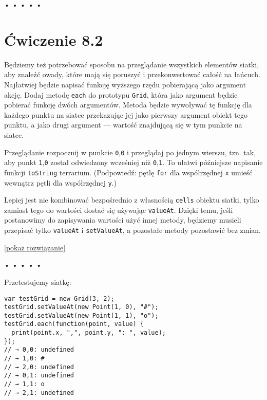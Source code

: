 \begin{center}
• • • • •
\end{center}

  
\section*{Ćwiczenie 8.2}
\label{sec:8.2}
  
    
Będziemy też potrzebować sposobu na przeglądanie wszystkich elementów siatki, aby znaleźć owady, które mają się poruszyć i przekonwertować całość na łańcuch. Najłatwiej będzie napisać funkcję wyższego rzędu pobierającą jako argument akcję. Dodaj metodę \texttt{each} do prototypu \texttt{Grid}, która jako argument będzie pobierać funkcję dwóch argumentów. Metoda będzie wywoływać tę funkcję dla każdego punktu na siatce przekazując jej jako pierwszy argument obiekt tego punktu, a jako drugi argument — wartość znajdującą się w tym punkcie na siatce.

    
Przeglądanie rozpocznij w punkcie \texttt{0},\texttt{0} i przeglądaj po jednym wierszu, tzn. tak, aby punkt \texttt{1},\texttt{0} został odwiedzony wcześniej niż \texttt{0},\texttt{1}. To ułatwi późniejsze napisanie funkcji \texttt{toString} terrarium. (Podpowiedź: pętlę \texttt{for} dla współrzędnej \texttt{x} umieść wewnątrz pętli dla współrzędnej \texttt{y}.)

    
Lepiej jest nie kombinować bezpośrednio z własnością \texttt{cells} obiektu siatki, tylko zamiast tego do wartości dostać się używając \texttt{valueAt}. Dzięki temu, jeśli postanowimy do zapisywania wartości użyć innej metody, będziemy musieli przepisać tylko \texttt{valueAt} i \texttt{setValueAt}, a pozostałe metody pozostawić bez zmian.

  
[\hyperref[sol:8.2]{pokaż rozwiązanie}]
  


\begin{center}
• • • • •
\end{center}

  
Przetestujemy siatkę:

  
\begin{verbatim} 
var testGrid = new Grid(3, 2);
testGrid.setValueAt(new Point(1, 0), "#");
testGrid.setValueAt(new Point(1, 1), "o");
testGrid.each(function(point, value) {
  print(point.x, ",", point.y, ": ", value);
});
// → 0,0: undefined
// → 1,0: #
// → 2,0: undefined
// → 0,1: undefined
// → 1,1: o
// → 2,1: undefined
\end{verbatim}


